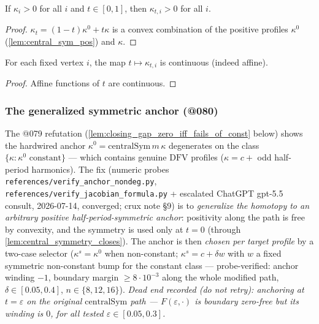 \begin{lemma}
  \label{lem:curv_homotopy_pos}
  If $\kappa_i > 0$ for all $i$ and $t \in [0,1]$, then $\kappa_{t,i} > 0$ for
  all $i$.
\end{lemma}
\begin{proof}

\leanok
  $\kappa_t = (1-t)\kappa^0 + t\kappa$ is a convex combination of the positive
  profiles $\kappa^0$ (\cref{lem:central_sym_pos}) and $\kappa$.
\end{proof}

\begin{lemma}
  \label{lem:continuous_curv_homotopy}
  For each fixed vertex $i$, the map $t \mapsto \kappa_{t,i}$ is continuous
  (indeed affine).
\end{lemma}
\begin{proof}

\leanok
  Affine functions of $t$ are continuous.
\end{proof}

\subsubsection*{The generalized symmetric anchor (@080)}

The @079 refutation (\cref{lem:closing_gap_zero_iff_fails_of_const} below) shows
the hardwired anchor $\kappa^0 = \mathrm{centralSym}\,m\,\kappa$ degenerates on
the class $\{\kappa : \kappa^0 \text{ constant}\}$ --- which contains genuine
$\mathrm{DFV}$ profiles ($\kappa = c + $ odd half-period harmonics). The fix
(numeric probes \texttt{references/verify\_anchor\_nondeg.py},
\texttt{references/verify\_jacobian\_formula.py} + escalated ChatGPT gpt-5.5
consult, 2026-07-14, converged; crux note \S9) is to \emph{generalize the
homotopy to an arbitrary positive half-period-symmetric anchor}: positivity
along the path is free by convexity, and the symmetry is used only at $t = 0$
(through \cref{lem:central_symmetry_closes}). The anchor is then \emph{chosen
per target profile} by a two-case selector ($\kappa^s = \kappa^0$ when
non-constant; $\kappa^s = c + \delta w$ with $w$ a fixed symmetric non-constant
bump for the constant class --- probe-verified: anchor winding $-1$, boundary
margin $\ge 8\cdot10^{-3}$ along the whole modified path, $\delta \in
[0.05, 0.4]$, $n \in \{8,12,16\}$). \emph{Dead end recorded (do not retry):
anchoring at $t = \varepsilon$ on the original $\mathrm{centralSym}$ path ---
$F(\varepsilon,\cdot)$ is boundary zero-free but its winding is $0$, for all
tested $\varepsilon \in [0.05, 0.3]$.}

